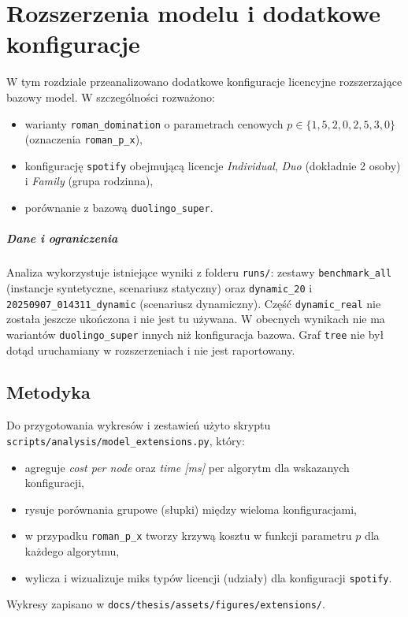 \chapter{Rozszerzenia modelu i dodatkowe konfiguracje}\label{chap:extensions}

W tym rozdziale przeanalizowano dodatkowe konfiguracje licencyjne rozszerzające bazowy model. W szczególności rozważono:
\begin{itemize}
  \item warianty \texttt{roman\_domination} o parametrach cenowych $p\in\{1{,}5,2{,}0,2{,}5,3{,}0\}$ (oznaczenia \texttt{roman\_p\_x}),
  \item konfigurację \texttt{spotify} obejmującą licencje \emph{Individual}, \emph{Duo} (dokładnie 2 osoby) i \emph{Family} (grupa rodzinna),
  \item porównanie z bazową \texttt{duolingo\_super}.
\end{itemize}

\paragraph{Dane i ograniczenia} Analiza wykorzystuje istniejące wyniki z folderu \texttt{runs/}: zestawy \texttt{benchmark\_all} (instancje syntetyczne, scenariusz statyczny) oraz \texttt{dynamic\_20} i \texttt{20250907\_014311\_dynamic} (scenariusz dynamiczny). Część \texttt{dynamic\_real} nie została jeszcze ukończona i nie jest tu używana. W obecnych wynikach nie ma wariantów \texttt{duolingo\_super} innych niż konfiguracja bazowa. Graf \texttt{tree} nie był dotąd uruchamiany w rozszerzeniach i nie jest raportowany.

\section{Metodyka}

Do przygotowania wykresów i zestawień użyto skryptu \texttt{scripts/analysis/model\_extensions.py}, który:
\begin{itemize}
  \item agreguje \textit{cost per node} oraz \textit{time [ms]} per algorytm dla wskazanych konfiguracji,
  \item rysuje porównania grupowe (słupki) między wieloma konfiguracjami,
  \item w przypadku \texttt{roman\_p\_x} tworzy krzywą kosztu w funkcji parametru $p$ dla każdego algorytmu,
  \item wylicza i wizualizuje miks typów licencji (udziały) dla konfiguracji \texttt{spotify}.
\end{itemize}
Wykresy zapisano w \texttt{docs/thesis/assets/figures/extensions/}.

